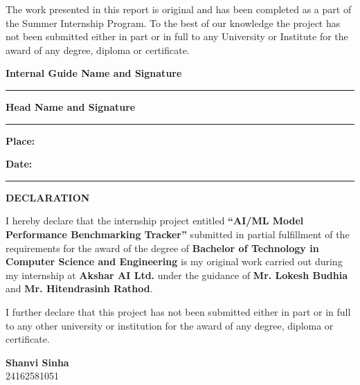 \documentclass[12pt,a4paper]{report}
\begin{document}
The work presented in this report is original and has been completed as a part of the Summer Internship Program. To the best of our knowledge the project has not been submitted either in part or in full to any University or Institute for the award of any degree, diploma or certificate.

\vspace{2cm}

\textbf{Internal Guide Name and Signature}

\vspace{1.5cm}

\rule{6cm}{0.4pt}

\vspace{2cm}

\textbf{Head Name and Signature}

\vspace{1.5cm}

\rule{6cm}{0.4pt}

\vspace{2cm}

\textbf{Place:}

\vspace{0.5cm}

\textbf{Date:} \rule{3cm}{0.4pt}

\newpage

\begin{center}
{\Large\textbf{DECLARATION}}
\end{center}

I hereby declare that the internship project entitled \textbf{``AI/ML Model Performance Benchmarking Tracker''} submitted in partial fulfillment of the requirements for the award of the degree of \textbf{Bachelor of Technology in Computer Science and Engineering} is my original work carried out during my internship at \textbf{Akshar AI Ltd.} under the guidance of \textbf{Mr. Lokesh Budhia} and \textbf{Mr. Hitendrasinh Rathod}.

I further declare that this project has not been submitted either in part or in full to any other university or institution for the award of any degree, diploma or certificate.

\vspace{2cm}

\begin{flushleft}
\textbf{Shanvi Sinha}\\
 24162581051
\end{flushleft}

\newpage
\end{document}
